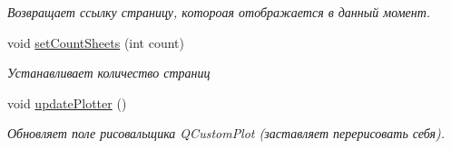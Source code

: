 \begin{DoxyCompactItemize}
\begin{DoxyCompactList}\small\item\em Возвращает ссылку страницу, котороая отображается в данный момент. \end{DoxyCompactList}\item 
void \hyperlink{class_graph_window_af7499e98193373a6322470c5dfe961a8}{set\+Count\+Sheets} (int count)\hypertarget{class_graph_window_af7499e98193373a6322470c5dfe961a8}{}\label{class_graph_window_af7499e98193373a6322470c5dfe961a8}

\begin{DoxyCompactList}\small\item\em Устанавливает количество страниц \end{DoxyCompactList}\item 
void \hyperlink{class_graph_window_acdc8aa7200c0bfddee48a16a0875986a}{update\+Plotter} ()\hypertarget{class_graph_window_acdc8aa7200c0bfddee48a16a0875986a}{}\label{class_graph_window_acdc8aa7200c0bfddee48a16a0875986a}

\begin{DoxyCompactList}\small\item\em Обновляет поле рисовальщика Q\+Custom\+Plot (заставляет перерисовать себя). \end{DoxyCompactList}\end{DoxyCompactItemize}
